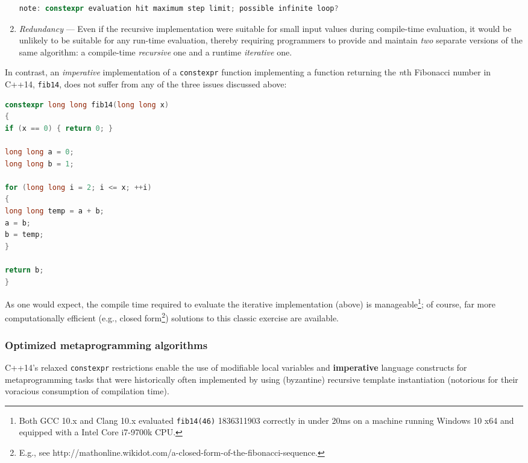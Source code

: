 \begin{enumerate}
{{{\begin{lstlisting}[language=C++, basicstyle={\ttfamily\footnotesize}]
note: constexpr evaluation hit maximum step limit; possible infinite loop?
\end{lstlisting}
}} %
} %
\item{\emph{Redundancy} — Even if the recursive implementation were suitable for small input values during compile-time evaluation, it would be unlikely to be suitable for any run-time evaluation, thereby requiring programmers to provide and maintain \emph{two} separate versions of the same algorithm: a compile-time \emph{recursive} one and a runtime \emph{iterative} one.}
\end{enumerate}

In contrast, an \emph{imperative} implementation of a \texttt{constexpr}
function implementing a function returning the \emph{n\/}th Fibonacci
number in C++14, \texttt{fib14}, does not suffer from any of the three
issues discussed above:

\begin{lstlisting}[language=C++]
constexpr long long fib14(long long x)
{
if (x == 0) { return 0; }

long long a = 0;
long long b = 1;

for (long long i = 2; i <= x; ++i)
{
long long temp = a + b;
a = b;
b = temp;
}

return b;
}
\end{lstlisting}

\noindent As one would expect, the compile time required to evaluate the iterative
implementation (above) is manageable{\cprotect\footnote{Both GCC 10.x
and Clang 10.x evaluated \texttt{fib14(46)} 1836311903 correctly in
under 20ms on a machine running Windows 10 x64 and equipped with a
Intel Core i7-9700k CPU.}}; of course, far more
computationally efficient (e.g., closed form{\cprotect\footnote{E.g.,
see
http://mathonline.wikidot.com/a-closed-form-of-the-fibonacci-sequence.}})
solutions to this classic exercise are available.

\subsubsection[Optimized metaprogramming algorithms]{Optimized metaprogramming algorithms}\label{optimized-metaprogramming-algorithms}

C++14's relaxed \texttt{constexpr} restrictions enable the use of
modifiable local variables and \textbf{imperative} language constructs
for metaprogramming tasks that were historically often implemented by
using (byzantine) recursive template instantiation (notorious for their
voracious consumption of compilation time).

